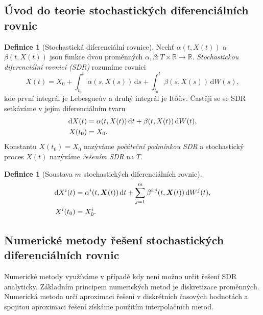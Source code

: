 \documentclass[a4paper,12pt]{report}
\theoremstyle{definition} \newtheorem{definice}[veta]{Definice}
\theoremstyle{remark}
\begin{document}
\subsection{Úvod do teorie stochastických diferenciálních rovnic}
\begin{definice}[Stochastická diferenciální rovnice]
Nechť $\alpha(t,X(t))$ a $\beta(t,X(t))$ jsou funkce dvou proměnných $\alpha,\beta:T\times\mathbb{R}\to\mathbb{R}$.
\textit{Stochastickou diferenciální rovnicí (SDR)} rozumíme rovnici
\begin{equation}
X(t)=X_0+\int_{t_0}^t\alpha(s,X(s))\,\mathrm{d}s+\int_{t_0}^t\beta(s,X(s))\,\mathrm{d}W(s),
\end{equation}
kde první integrál je Lebesgueův a druhý integrál je It\^oův.
Častěji se se SDR setkáváme v jejím diferenciálním tvaru
\begin{align}\label{SDR_def}
\mathrm{d}X(t)&=\alpha(t,X(t))\,\mathrm{d}t+\beta(t,X(t))\,\mathrm{d}W(t),\\%
X(t_0)&=X_0.\notag
\end{align}
Konstantu $X(t_0)=X_0$ nazýváme \textit{počáteční podmínkou SDR} a stochastický proces $X(t)$ nazýváme \textit{řešením SDR} na $T$.
\end{definice}

\begin{definice}[Soustava $m$ stochastických diferenciálních rovnic]
\begin{align}\label{SSDR_def}
\mathrm{d}X^i(t)&=\alpha^i(t,\boldsymbol{X}(t))\,\mathrm{d}t+\sum_{j=1}^m\beta^{i,j}(t,\boldsymbol{X}(t))\,\mathrm{d}W^j(t),\\%
X^i(t_0)&=X^i_0.\notag
\end{align}
\end{definice}

\subsection{Numerické metody řešení stochastických diferenciálních rovnic}
Numerické metody využíváme v případě kdy není možno určit řešení SDR analyticky.
Základním principem numerických metod je diskretizace proměnných.
Numerická metoda určí aproximaci řešení v diskrétních časových hodnotách a spojitou aproximaci řešení získáme použitím interpolačních metod.
\end{document}
